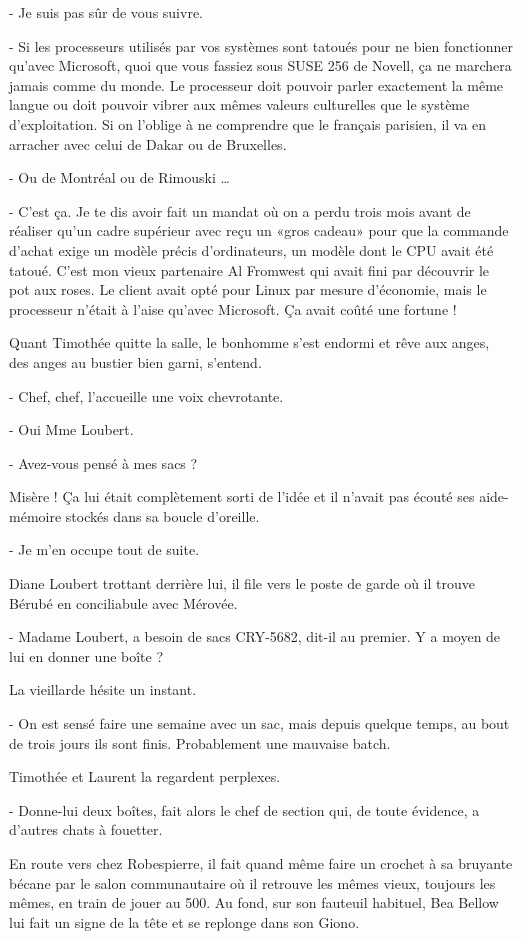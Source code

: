 - Je suis pas sûr de vous suivre.

- Si les processeurs utilisés par vos systèmes sont tatoués pour ne bien fonctionner qu’avec Microsoft, quoi que vous fassiez sous SUSE 256 de Novell, ça ne marchera jamais comme du monde. Le processeur doit pouvoir parler exactement la même langue ou doit pouvoir vibrer aux mêmes valeurs culturelles que le système d’exploitation. Si on l’oblige à ne comprendre que le français parisien, il va en arracher avec celui de Dakar ou de Bruxelles.

- Ou de Montréal ou de Rimouski …

- C’est ça. Je te dis avoir fait un mandat où on a perdu trois mois avant de réaliser qu’un cadre supérieur avec reçu un «gros cadeau» pour que la commande d’achat exige un modèle précis d’ordinateurs, un modèle dont le CPU avait été tatoué. C’est mon vieux partenaire Al Fromwest qui avait fini par découvrir le pot aux roses. Le client avait opté pour Linux par mesure d’économie, mais le processeur n’était à l’aise qu’avec Microsoft. Ça avait coûté une fortune !

Quant Timothée quitte la salle, le bonhomme s’est endormi et rêve aux anges, des anges au bustier bien garni, s’entend.

- Chef, chef, l’accueille une voix chevrotante.

- Oui Mme Loubert.

- Avez-vous pensé à mes sacs ?

Misère ! Ça lui était complètement sorti de l’idée et il n’avait pas écouté ses aide-mémoire stockés dans sa boucle d’oreille.

- Je m’en occupe tout de suite.

Diane Loubert trottant derrière lui, il file vers le poste de garde où il trouve Bérubé en conciliabule avec Mérovée.

- Madame Loubert, a besoin de sacs CRY-5682, dit-il au premier. Y a moyen de lui en donner une boîte ?

La vieillarde hésite un instant.

- On est sensé faire une semaine avec un sac, mais depuis quelque temps, au bout de trois jours ils sont finis. Probablement une mauvaise batch.

Timothée et Laurent la regardent perplexes.

- Donne-lui deux boîtes, fait alors le chef de section qui, de toute évidence, a d’autres chats à fouetter.

En route vers chez Robespierre, il fait quand même faire un crochet à sa bruyante bécane par le salon communautaire où il retrouve les mêmes vieux, toujours les mêmes, en train de jouer au 500. Au fond, sur son fauteuil habituel, Bea Bellow lui fait un signe de la tête et se replonge dans son Giono.

